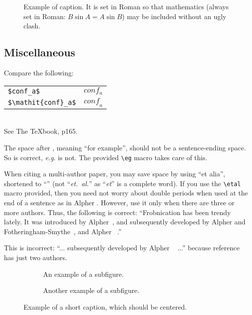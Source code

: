 \documentclass[10pt,twocolumn,letterpaper]{article}
\begin{document}
  \begin{figure}[t]
    \centering
    \fbox{\rule{0pt}{2in} \rule{0.9\linewidth}{0pt}}

    \caption{Example of caption.
    It is set in Roman so that mathematics (always set in Roman: $B \sin A = A \sin B$) may be included without an ugly clash.}
    \label{fig:onecol}
  \end{figure}

  \subsection{Miscellaneous}

  \noindent
  Compare the following:\\
  \begin{tabular}{ll}
  \verb'$conf_a$' &  $conf_a$ \\
  \verb'$\mathit{conf}_a$' & $\mathit{conf}_a$
  \end{tabular}\\
  See The \TeX book, p165.

  The space after \eg, meaning ``for example'', should not be a sentence-ending space.
  So \eg is correct, {\em e.g.} is not.
  The provided \verb'\eg' macro takes care of this.

  When citing a multi-author paper, you may save space by using ``et alia'', shortened to ``\etal'' (not ``{\em et.\ al.}'' as ``{\em et}'' is a complete word).
  If you use the \verb'\etal' macro provided, then you need not worry about double periods when used at the end of a sentence as in Alpher \etal.
  However, use it only when there are three or more authors.
  Thus, the following is correct:
    ``Frobnication has been trendy lately.
    It was introduced by Alpher~\cite{Alpher02}, and subsequently developed by
    Alpher and Fotheringham-Smythe~\cite{Alpher03}, and Alpher \etal~\cite{Alpher04}.''

  This is incorrect: ``... subsequently developed by Alpher \etal~\cite{Alpher03} ...'' because reference~\cite{Alpher03} has just two authors.




  \begin{figure*}
    \centering
    \begin{subfigure}{0.68\linewidth}
      \fbox{\rule{0pt}{2in} \rule{.9\linewidth}{0pt}}
      \caption{An example of a subfigure.}
      \label{fig:short-a}
    \end{subfigure}
    \hfill
    \begin{subfigure}{0.28\linewidth}
      \fbox{\rule{0pt}{2in} \rule{.9\linewidth}{0pt}}
      \caption{Another example of a subfigure.}
      \label{fig:short-b}
    \end{subfigure}
    \caption{Example of a short caption, which should be centered.}
    \label{fig:short}
  \end{figure*}
\end{document}

